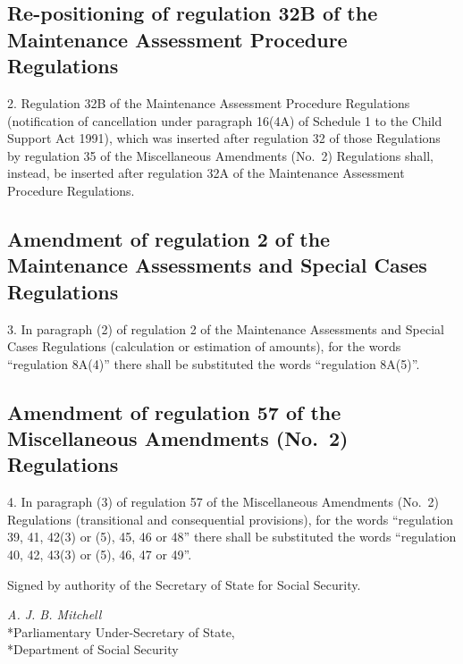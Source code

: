 \documentclass[a4paper]{article}
\begin{document}
\subsection[2. Re-positioning of regulation 32B of the Maintenance Assessment Procedure Regulations]{Re-positioning of regulation 32B of the Maintenance Assessment Procedure Regulations}

2.  Regulation 32B of the Maintenance Assessment Procedure Regulations (notification of cancellation under paragraph 16(4A) of Schedule 1 to the Child Support Act 1991), which was inserted after regulation 32 of those Regulations by regulation 35 of the Miscellaneous Amendments (No.\ 2) Regulations shall, instead, be inserted after regulation 32A of the Maintenance Assessment Procedure Regulations.

\subsection[3. Amendment of regulation 2 of the Maintenance Assessments and Special Cases Regulations]{Amendment of regulation 2 of the Maintenance Assessments and Special Cases Regulations}

3.  In paragraph (2) of regulation 2 of the Maintenance Assessments and Special Cases Regulations (calculation or estimation of amounts), for the words “regulation 8A(4)” there shall be substituted the words “regulation 8A(5)”.

\subsection[4. Amendment of regulation 57 of the Miscellaneous Amendments (No.\ 2) Regulations]{\sloppy Amendment of regulation 57 of the Miscellaneous Amendments (No.\ 2) Regulations}

4.  In paragraph (3) of regulation 57 of the Miscellaneous Amendments (No.\ 2) Regulations (transitional and consequential provisions), for the words “regulation 39, 41, 42(3) or (5), 45, 46 or 48” there shall be substituted the words “regulation 40, 42, 43(3) or (5), 46, 47 or 49”.


\bigskip

Signed by authority of the Secretary of State for Social Security.

{\raggedleft
\emph{A. J. B. Mitchell}\\*Parliamentary Under-Secretary of State,\\*Department of Social Security

}
\end{document}
